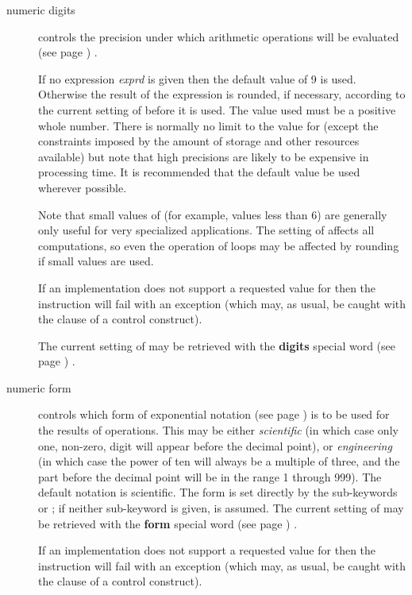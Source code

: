 \begin{description}
\item[numeric digits]\label{refndigits}

controls the precision under which arithmetic operations will be
 evaluated (see page \pageref{refndi2}) .

If no expression \emph{exprd} is given then the default value of 9
is used.
Otherwise the result of the expression is rounded, if necessary,
according to the current setting of  before it is
used.
The value used must be a positive whole number.
 There is normally no limit to the value for 
(except the constraints imposed by the amount of storage and other
resources available) but note that high precisions are likely to be
expensive in processing time.
It is recommended that the default value be used wherever possible.
 
Note that small values of  (for example, values
less than 6) are generally only useful for very specialized applications.
The setting of  affects all computations, so even
the operation of loops may be affected by rounding if small values are
used.
 
If an implementation does not support a requested value for  then the instruction will fail with an exception (which may,
as usual, be caught with the  clause of a control
construct).
 
The current setting of  may be retrieved with the
 \textbf{digits} special word (see page \pageref{refswdigit}) .
\item[numeric form]\label{refnform}

controls which form of  exponential notation (see page \pageref{refnfo2})  is to
be used for the results of operations.
This may be either \emph{scientific} (in which case only one,
non-zero, digit will appear before the decimal point), or
\emph{engineering} (in which case the power of ten will always be a
multiple of three, and the part before the decimal point will be in the
range 1 through 999).
The default notation is scientific.
 The form is set directly by the sub-keywords  or
; if neither sub-keyword is given,
 is assumed.
The current setting of  may be retrieved with the
 \textbf{form} special word (see page \pageref{refswform}) .
 
If an implementation does not support a requested value for  then the instruction will fail with an exception (which may,
as usual, be caught with the  clause of a control
construct).
\end{description}
 

